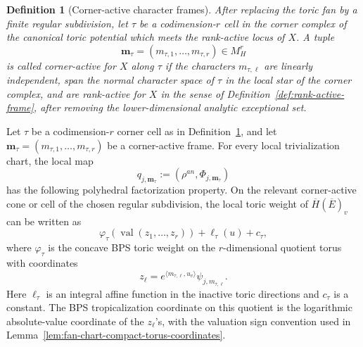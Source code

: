\documentclass[10pt,a4paper]{amsart}
\theoremstyle{plain}
\newtheorem{definition}[theorem]{Definition}
\theoremstyle{plain}
\numberwithin{equation}{section}
\providecommand{\bE}{\overline{E}}
\begin{document}
\begin{definition}[Corner-active character frames]
	\label{def:corner-active-frame}
	After replacing the toric fan by a finite regular subdivision, let
	\(\tau\) be a codimension-\(r\) cell in the corner complex of the canonical
	toric potential which meets the rank-active locus of \(X\).  A tuple
	\[
	\mathbf m_\tau=(m_{\tau,1},\ldots,m_{\tau,r})\in M_H^r
	\]
	is called corner-active for \(X\) along \(\tau\) if the characters
	\(m_{\tau,\ell}\) are linearly independent, span the normal character space of
	\(\tau\) in the local star of the corner complex, and are rank-active for
	\(X\) in the sense of Definition~\ref{def:rank-active-frame}, after removing
	the lower-dimensional analytic exceptional set.
\end{definition}

\begin{prop}
	\label{input:rank-active-bps-quotient-compatibility}
	Let \(\tau\) be a codimension-\(r\) corner cell as in
	Definition~\ref{def:corner-active-frame}, and let
	\(\mathbf m_\tau=(m_{\tau,1},\ldots,m_{\tau,r})\) be a corner-active frame.
	For every local trivialization chart, the local map
	\[
	q_{j,\mathbf m_\tau}:=(\rho^{an},\Phi_{j,\mathbf m_\tau})
	\]
	has the following polyhedral factorization property.  On the relevant
	corner-active cone or cell of the chosen regular subdivision, the local toric
	weight of \(\overline H(\bE)_v\) can be written as
	\[
	\varphi_{\tau}(\operatorname{val}(z_1,\ldots,z_r))
	+\ell_{\tau}(u)+c_{\tau},
	\]
	where \(\varphi_{\tau}\) is the concave BPS toric weight on the
	\(r\)-dimensional quotient torus with coordinates
	\[
	z_\ell=e^{\langle m_{\tau,\ell},u_v\rangle}
	\psi_{j,m_{\tau,\ell}} .
	\]
	Here \(\ell_{\tau}\) is an integral affine function in the inactive
	toric directions and \(c_{\tau}\) is a constant.  The BPS
	tropicalization coordinate on this quotient is the logarithmic absolute-value
	coordinate of the \(z_\ell\)'s, with the valuation sign convention used in
	Lemma~\ref{lem:fan-chart-compact-torus-coordinates}.
\end{prop}
\end{document}
